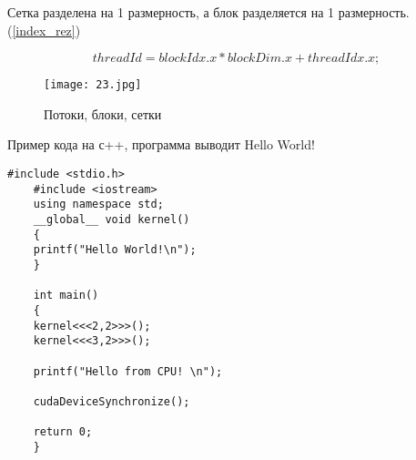 \documentclass[a4paper, 12pt]{report}
\begin{document}
    Сетка разделена на 1 размерность, а блок разделяется на 1 размерность.(\ref{index_rez})

    \begin{equation}
       	threadId = blockIdx.x *blockDim.x + threadIdx.x;  		
        \label{index_rez}
    \end{equation}


    \printbibliography

        \begin{figure}[!h]
    \centering
    \texttt{[image: 23.jpg]}
    \caption{Потоки, блоки, сетки}
    \label{}
    \end{figure}

    Пример кода на с++, программа выводит Hello World!
    \begin{lstlisting}[label=some-code,caption= Первый код]
    #include <stdio.h>
    #include <iostream>
    using namespace std;
    __global__ void kernel()
    {
    printf("Hello World!\n");
    }

    int main()
    {
    kernel<<<2,2>>>();
    kernel<<<3,2>>>();

    printf("Hello from CPU! \n");

    cudaDeviceSynchronize();

    return 0;
    }   

    \end{lstlisting}


 
\end{document}
